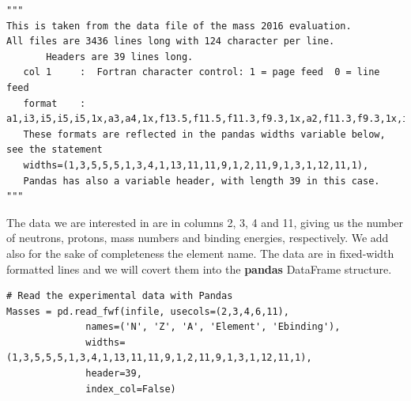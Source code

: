 \documentclass{beamer}
\begin{document}
\begin{frame}
\begin{verbatim}
"""                                                                                                                         
This is taken from the data file of the mass 2016 evaluation.                                                               
All files are 3436 lines long with 124 character per line.                                                                  
       Headers are 39 lines long.                                                                                           
   col 1     :  Fortran character control: 1 = page feed  0 = line feed                                                     
   format    :  a1,i3,i5,i5,i5,1x,a3,a4,1x,f13.5,f11.5,f11.3,f9.3,1x,a2,f11.3,f9.3,1x,i3,1x,f12.5,f11.5                     
   These formats are reflected in the pandas widths variable below, see the statement                                       
   widths=(1,3,5,5,5,1,3,4,1,13,11,11,9,1,2,11,9,1,3,1,12,11,1),                                                            
   Pandas has also a variable header, with length 39 in this case.                                                          
"""

\end{verbatim}


The data we are interested in are in columns 2, 3, 4 and 11, giving us
the number of neutrons, protons, mass numbers and binding energies,
respectively. We add also for the sake of completeness the element name. The data are in fixed-width formatted lines and we will
covert them into the \textbf{pandas} DataFrame structure.




















\begin{verbatim}
# Read the experimental data with Pandas
Masses = pd.read_fwf(infile, usecols=(2,3,4,6,11),
              names=('N', 'Z', 'A', 'Element', 'Ebinding'),
              widths=(1,3,5,5,5,1,3,4,1,13,11,11,9,1,2,11,9,1,3,1,12,11,1),
              header=39,
              index_col=False)


\end{verbatim}
\end{frame}
\end{document}
